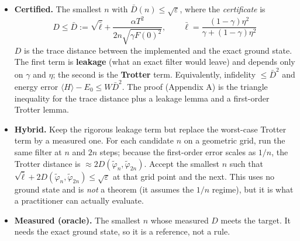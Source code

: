 \documentclass[
]{article}
\providecommand{\tightlist}{%
  \setlength{\itemsep}{0pt}\setlength{\parskip}{0pt}}
\begin{document}
\begin{itemize}
\tightlist
\item
  \textbf{Certified.} The smallest \(n\) with
  \(\bar D(n)\le\sqrt\varepsilon\), where the \emph{certificate} is
  \[\boxed{\;D\le\bar D:=\sqrt{\bar\ell}+\frac{\alpha T^2}{2n\sqrt{\gamma F(0)^2}},\qquad\bar\ell=\frac{(1-\gamma)\eta^2}{\gamma+(1-\gamma)\eta^2}\;}\]
  \(D\) is the trace distance between the implemented and the exact
  ground state. The first term is \textbf{leakage} (what an exact filter
  would leave) and depends only on \(\gamma\) and \(\eta\); the second
  is the \textbf{Trotter} term. Equivalently, infidelity \(\le\bar D^2\)
  and energy error \(\langle H\rangle-E_0\le W\bar D^2\). The proof
  (Appendix A) is the triangle inequality for the trace distance plus a
  leakage lemma and a first-order Trotter lemma.
\item
  \textbf{Hybrid.} Keep the rigorous leakage term but replace the
  worst-case Trotter term by a measured one. For each candidate \(n\) on
  a geometric grid, run the same filter at \(n\) and \(2n\) steps;
  because the first-order error scales as \(1/n\), the Trotter distance
  is \(\approx2D(\tilde\varphi_n,\tilde\varphi_{2n})\). Accept the
  smallest \(n\) such that
  \(\sqrt{\bar\ell}+2D(\tilde\varphi_n,\tilde\varphi_{2n})\le\sqrt\varepsilon\)
  at that grid point and the next. This uses no ground state and is
  \emph{not} a theorem (it assumes the \(1/n\) regime), but it is what a
  practitioner can actually evaluate.
\item
  \textbf{Measured (oracle).} The smallest \(n\) whose measured \(D\)
  meets the target. It needs the exact ground state, so it is a
  reference, not a rule.
\end{itemize}
\end{document}
